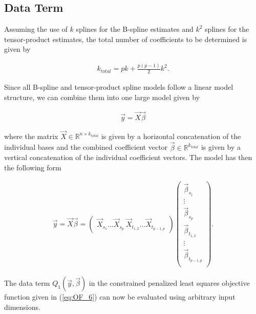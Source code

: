 \documentclass[10pt,a4paper]{report}
\begin{document}
\subsection{Data Term}



Assuming the use of $k$ splines for the B-spline estimates and $k^2$ splines for the tensor-product estimates, the total number of coefficients to be determined is given by 

\begin{align}\label{eq:tps_total_number_of_coef}
	k_{total} = pk + \frac{p(p-1)}{2}k^2. 
\end{align}

Since all B-spline and tensor-product spline models follow a linear model structure, we can combine them into one large model given by

\begin{align}\label{eq:tps_lin_mod}
	\vec{y} = \vec{X} \vec{\beta}
\end{align}

where the matrix $\vec{X} \in \mathbb{R}^{n \times k_{total}}$ is given by a horizontal concatenation of the individual bases and the combined coefficient vector $\vec{\beta} \in \mathbb{R}^{k_{total}}$ is given by a vertical concatenation of the individual coefficient vectors. The model has then the following form

\begin{align}\label{eq:tps_lin_model_verbose}
	\vec{y} = \vec{X} \vec{\beta} = 
	\begin{pmatrix} \vec{X}_{s_1} \dots \vec{X}_{s_p} \ \vec{X}_{t_{1,2}} \dots \vec{X}_{t_{p-1,p}} \end{pmatrix} 
	\begin{pmatrix} \vec{\beta}_{s_1} \\ 
		\vdots  \\ 
		\vec{\beta}_{s_p} \\ 
		\vec{\beta}_{t_{1,2}} \\ 
		\vdots \\ 
		\vec{\beta}_{t_{p-1,p}} \\
	\end{pmatrix}.
\end{align}

The data term $Q_1(\vec{y}, \vec{\beta})$ in the constrained penalized least squares objective function given in (\ref{eq:OF_6}) can now be evaluated using arbitrary input dimensions. 

\end{document}
